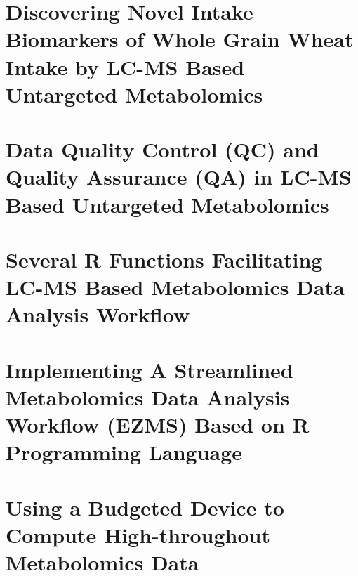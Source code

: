 \documentclass[]{report}
\begin{document}
\chapter{Discovering Novel Intake Biomarkers of Whole Grain Wheat Intake by LC-MS Based Untargeted Metabolomics}

\chapter{Data Quality Control (QC) and Quality Assurance (QA) in LC-MS Based Untargeted Metabolomics}


\chapter{Several R Functions Facilitating LC-MS Based Metabolomics Data Analysis Workflow}


\chapter{Implementing A Streamlined Metabolomics Data Analysis Workflow (EZMS) Based on R Programming Language}

\chapter{Using a Budgeted Device to Compute High-throughout Metabolomics Data}


\end{document}
